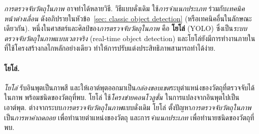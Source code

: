 \textit{การตรวจจับวัตถุในภาพ} อาจทำได้หลายวิธี. 
วิธีแบบดั่งเดิม ใช้\textit{การจำแนกประเภท} ร่วมกับ\textit{เทคนิคหน้าต่างเลื่อน} 
ดังอภิปรายในหัวข้อ~\ref{sec: classic object detection}
(หรือเทคนิคอื่นในลักษณะเดียวกัน\cite{FasterRCNN2015, DeformablePartModel2010}).
หนึ่งในศาสตร์และศิลป์ของ\textit{การตรวจจับวัตถุในภาพ} คือ \textbf{โยโล่} (YOLO\cite{YOLO1}) ซึ่งเป็น\textit{ระบบตรวจจับวัตถุในภาพแบบเวลาจริง} (real-time object detection)
และโยโล่ยังมีการทำงานภายใน ที่ใช้โครงสร้างกลไกหลักอย่างเดียว ทำให้การปรับแต่งประสิทธิภาพสามารถทำได้ง่าย.

\paragraph{โยโล่.}
\label{sec: YOLO}
%
\textit{โยโล่}\cite{YOLO1, YOLO2}%
รับอินพุตเป็นภาพสี และให้เอาต์พุตออกมาเป็น\textit{กล่องขอบเขต}ระบุตำแหน่งของวัตถุที่ตรวจจับได้ในภาพ พร้อมชนิดของวัตถุที่พบ.
โยโล่ ใช้\textit{โครงข่ายคอนโวลูชั่น} ในการแปลงจากอินพุตไปเป็นเอาต์พุต.
%
ต่างจากระบบ\textit{การตรวจจับวัตถุในภาพ}แบบดั่งเดิม
โยโล่ ตั้งปัญหา\textit{การตรวจจับวัตถุในภาพ} เป็น\textit{การหาค่าถดถอย} เพื่อทำนายตำแหน่งของวัตถุ
และการ\textit{จำแนกประเภท} เพื่อทำนายชนิดของวัตถุที่พบ.
%

